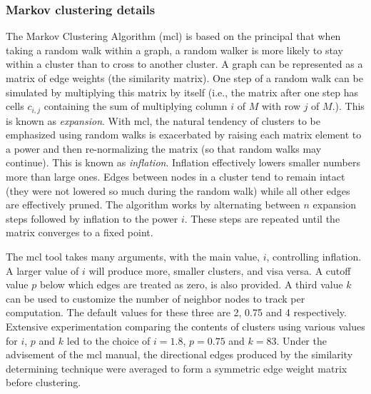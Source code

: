 \subsubsection{Markov clustering details}
The Markov Clustering Algorithm (mcl) is based on the principal that when taking a random walk within a graph, a random walker is more likely to stay within a cluster than to cross to another cluster.  A graph can be represented as a matrix of edge weights (the similarity matrix).  One step of a random walk can be simulated by multiplying this matrix by itself (i.e., the matrix after one step has cells $c_{i,j}$ containing the sum of multiplying column $i$ of $M$ with row $j$ of $M$.).  This is known as \emph{expansion}.  With mcl, the natural tendency of clusters to be emphasized using random walks is exacerbated by raising each matrix element to a power and then re-normalizing the matrix (so that random walks may continue).  This is known as \emph{inflation}.  Inflation effectively lowers smaller numbers more than large ones.  Edges between nodes in a cluster tend to remain intact (they were not lowered so much during the random walk) while all other edges are effectively pruned.  The algorithm works by alternating between $n$ expansion steps followed by inflation to the power $i$.  These steps are repeated until the matrix converges to a fixed point.

The mcl tool takes many arguments, with the main value, $i$, controlling inflation.  A larger value of $i$ will produce more, smaller clusters, and visa versa.  A cutoff value $p$ below which edges are treated as zero, is also provided.  A third value $k$ can be used to customize the number of neighbor nodes to track per computation.  The default values for these three are 2, 0.75 and 4 respectively.  Extensive experimentation comparing the contents of clusters using various values for $i$, $p$ and $k$ led to the choice of $i=1.8$, $p=0.75$ and $k=83$.  Under the advisement of the mcl manual, the directional edges produced by the similarity determining technique were averaged to form a symmetric edge weight matrix before clustering.
